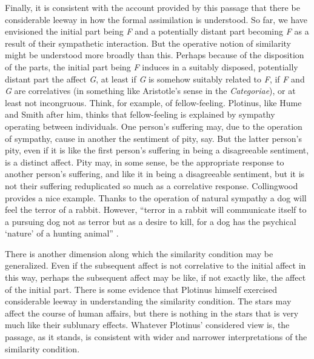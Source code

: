 Finally, it is consistent with the account provided by this passage that there be considerable leeway in how the formal assimilation is understood. So far, we have envisioned the initial part being \emph{F} and a potentially distant part becoming \emph{F} as a result of their sympathetic interaction. But the operative notion of similarity might be understood more broadly than this. Perhaps because of the disposition of the parts, the initial part being \emph{F} induces in a suitably disposed, potentially distant part the affect \emph{G}, at least if \emph{G} is somehow suitably related to \emph{F}, if \emph{F} and \emph{G} are correlatives (in something like Aristotle's sense in the \emph{Categoriae}), or at least not incongruous. Think, for example, of fellow-feeling. Plotinus, like Hume and Smith after him, thinks that fellow-feeling is explained by sympathy operating between individuals. One person's suffering may, due to the operation of sympathy, cause in another the sentiment of pity, say. But the latter person's pity, even if it is like the first person's suffering in being a disagreeable sentiment, is a distinct affect. Pity may, in some sense, be the appropriate response to another person's suffering, and like it in being a disagreeable sentiment, but it is not their suffering reduplicated so much as a correlative response. Collingwood provides a nice example. Thanks to the operation of natural sympathy a dog will feel the terror of a rabbit. However, ``terror in a rabbit will communicate itself to a pursuing dog not as terror but as a desire to kill, for a dog has the psychical `nature' of a hunting animal'' \citep[231]{Collingwood:1938bh}.

There is another dimension along which the similarity condition may be generalized. Even if the subsequent affect is not correlative to the initial affect in this way, perhaps the subsequent affect may be like, if not exactly like, the affect of the initial part. There is some evidence that Plotinus himself exercised considerable leeway in understanding the similarity condition. The stars may affect the course of human affairs, but there is nothing in the stars that is very much like their sublunary effects. Whatever Plotinus' considered view is, the passage, as it stands, is consistent with wider and narrower interpretations of the similarity condition.

